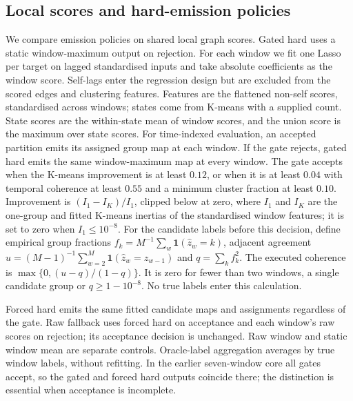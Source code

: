 \documentclass[11pt]{article}
\begin{document}
\subsection{Local scores and hard-emission policies}
\label{sec:method}

We compare emission policies on shared local graph scores. Gated hard uses a static window-maximum output on rejection.
For each window we fit one Lasso per target on lagged standardised inputs and
take absolute coefficients as the window score. Self-lags enter the regression
design but are excluded from the scored edges and clustering features.
Features are the flattened non-self scores, standardised across windows; states
come from K-means with a supplied count. State scores are the within-state mean
of window scores, and the union score is the maximum over state scores.
For time-indexed evaluation, an accepted partition emits its assigned group
map at each window. If the gate rejects, gated hard emits the same
window-maximum map at every window. The
gate accepts when the K-means improvement is at least $0.12$, or when it is at
least $0.04$ with temporal coherence at least $0.55$ and a minimum cluster
fraction at least $0.10$. Improvement is $(I_1-I_K)/I_1$, clipped below at zero,
where $I_1$ and $I_K$ are the one-group and fitted K-means inertias of the
standardised window features; it is set to zero when $I_1\le10^{-8}$.
For the candidate labels before this decision, define empirical group fractions
$f_k=M^{-1}\sum_w\mathbf1(\widehat z_w=k)$, adjacent agreement
$u=(M-1)^{-1}\sum_{w=2}^M\mathbf1(\widehat z_w=\widehat z_{w-1})$ and
$q=\sum_k f_k^2$. The executed coherence is $\max\{0,(u-q)/(1-q)\}$.
It is zero for fewer than two windows, a single candidate group or
$q\ge1-10^{-8}$. No true labels enter this calculation.

Forced hard emits the same fitted candidate maps and assignments regardless of
the gate. Raw fallback uses forced hard on acceptance and each window's raw
scores on rejection; its acceptance decision is unchanged. Raw window and static
window mean are separate controls. Oracle-label aggregation averages by true
window labels, without refitting. In the earlier seven-window core all gates
accept, so the gated and forced hard outputs coincide there; the distinction
is essential when acceptance is incomplete.
\end{document}
